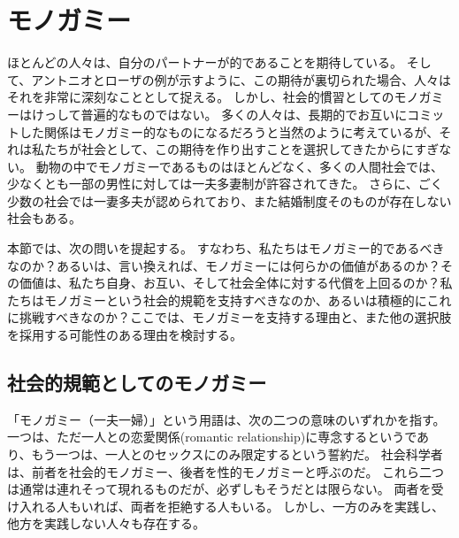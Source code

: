 \documentclass[paper=a4,book,openany]{jlreq}
\begin{document}
\section{モノガミー}

ほとんどの人々は、自分のパートナーが的であることを期待している。
そして、アントニオとローザの例が示すように、この期待が裏切られた場合、人々はそれを非常に深刻なこととして捉える。
しかし、社会的慣習としてのモノガミーはけっして普遍的なものではない。
多くの人々は、長期的でお互いにコミットした関係はモノガミー的なものになるだろうと当然のように考えているが、それは私たちが社会として、この期待を作り出すことを選択してきたからにすぎない。
動物の中でモノガミーであるものはほとんどなく、多くの人間社会では、少なくとも一部の男性に対しては一夫多妻制が許容されてきた。
さらに、ごく少数の社会では一妻多夫が認められており、また結婚制度そのものが存在しない社会もある。

本節では、次の問いを提起する。
すなわち、私たちはモノガミー的であるべきなのか？あるいは、言い換えれば、モノガミーには何らかの価値があるのか？その価値は、私たち自身、お互い、そして社会全体に対する代償を上回るのか？私たちはモノガミーという社会的規範を支持すべきなのか、あるいは積極的にこれに挑戦すべきなのか？ここでは、モノガミーを支持する理由と、また他の選択肢を採用する可能性のある理由を検討する。

\subsection{社会的規範としてのモノガミー}

「{モノガミー}（一夫一婦）」という用語は、次の二つの意味のいずれかを指す。
一つは、ただ一人との恋愛関係(romantic relationship)に専念するというであり、もう一つは、一人とのセックスにのみ限定するという誓約だ。
社会科学者は、前者を社会的モノガミー、後者を性的モノガミーと呼ぶのだ。
これら二つは通常は連れそって現れるものだが、必ずしもそうだとは限らない。
両者を受け入れる人もいれば、両者を拒絶する人もいる。
しかし、一方のみを実践し、他方を実践しない人々も存在する。
\end{document}
